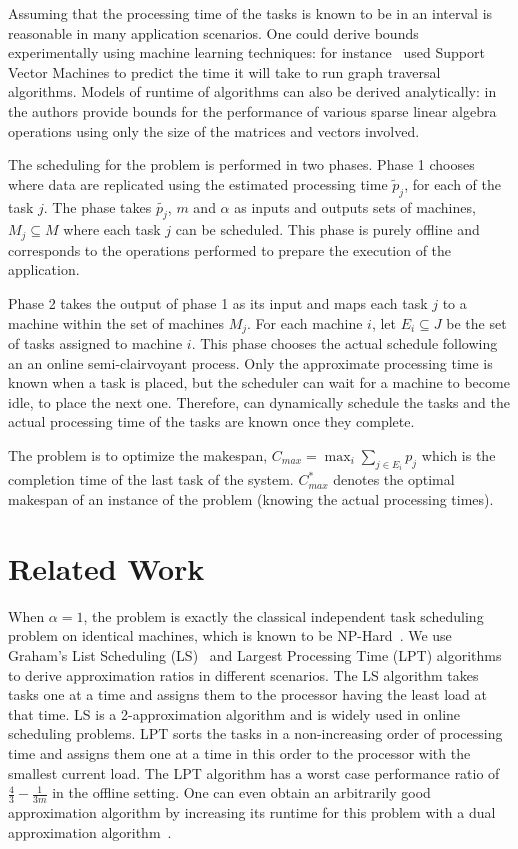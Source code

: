 \documentclass[10pt, conference, compsocconf]{IEEEtran}
\begin{document}
Assuming that the processing time of the tasks is known to be in an
interval is reasonable in many application scenarios. One could derive
bounds experimentally using machine learning techniques: for
instance~\cite{You14-ICPP} used Support Vector Machines to predict the time it
will take to run graph traversal algorithms. Models of runtime of
algorithms can also be derived analytically:
in~\cite{Erlebacher14-ICS} the authors provide bounds for the
performance of various sparse linear algebra operations using only the
size of the matrices and vectors involved.


The scheduling for the problem is performed in two phases. Phase 1
chooses where data are replicated using the estimated processing time
$\tilde p_j $, for each of the task $j$. The phase takes
$\tilde{p_j}$, $m$ and $\alpha$ as inputs and outputs sets of machines,
$M_j \subseteq M $ where each task $j$ can be scheduled. This phase is
purely offline and corresponds to the operations performed to prepare
the execution of the application.

Phase 2 takes the output of phase 1 as its input and maps each task $j$
to a machine within the set of machines $M_j$. For each machine $i$,
let $E_i \subseteq J$ be the set of tasks assigned to machine
$i$. This phase chooses the actual schedule following an an online
semi-clairvoyant process. Only the approximate processing time is
known when a task is placed, but the scheduler can wait for a machine
to become idle, to place the next one. Therefore, can dynamically
schedule the tasks and the actual processing time of the tasks are
known once they complete.

The problem is to optimize the makespan, $C_{max} = \max_i \sum_{j \in E_i} p_j$ which is the
completion time of the last task of the system. $C_{max}^{*}$ denotes
the optimal makespan of an instance of the problem (knowing the
actual processing times).

\section{Related Work}\label{sec3}

When $\alpha = 1$, the problem is exactly the classical independent
task scheduling problem on identical machines, which is known to be
NP-Hard~\cite{GareyJohnson79}. We use Graham's List Scheduling
(LS)~\cite{Graham66} and Largest Processing Time (LPT)
algorithms~\cite{Graham69boundson} to derive approximation ratios in
different scenarios. The LS algorithm takes tasks one at a time and
assigns them to the processor having the least load at that time. LS is a
2-approximation algorithm and is widely used in online scheduling
problems. LPT sorts the tasks in a non-increasing order of processing time and
assigns them one at a time in this order to the processor with the
smallest current load. The LPT algorithm has a worst case performance
ratio of $\frac{4}{3}-\frac{1}{3m}$ in the offline setting. One can
even obtain an arbitrarily good approximation algorithm by increasing
its runtime for this problem with a dual approximation
algorithm~\cite{Hoch87}.
\end{document}
